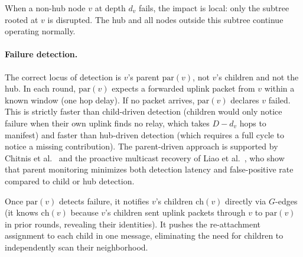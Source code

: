 \documentclass{article}
\begin{document}
When a non-hub node $v$ at depth $d_v$ fails, the impact is local: only the subtree
rooted at $v$ is disrupted. The hub and all nodes outside this subtree continue operating
normally.

\paragraph{Failure detection.} The correct locus of detection is $v$'s parent
$\mathrm{par}(v)$, not $v$'s children and not the hub. In each round, $\mathrm{par}(v)$
expects a forwarded uplink packet from $v$ within a known window (one hop delay). If no
packet arrives, $\mathrm{par}(v)$ declares $v$ failed. This is strictly faster than
child-driven detection (children would only notice failure when their own uplink finds no
relay, which takes $D - d_v$ hops to manifest) and faster than hub-driven detection
(which requires a full cycle to notice a missing contribution). The parent-driven approach
is supported by Chitnis et al.\ \citep{chitnis2009} and the proactive multicast recovery
of Liao et al.\ \citep{liao2007proactive}, who show that parent monitoring minimizes both
detection latency and false-positive rate compared to child or hub detection.

Once $\mathrm{par}(v)$ detects failure, it notifies $v$'s children
$\mathrm{ch}(v)$ directly via $G$-edges (it knows $\mathrm{ch}(v)$ because $v$'s
children sent uplink packets through $v$ to $\mathrm{par}(v)$ in prior rounds, revealing
their identities). It pushes the re-attachment assignment to each child in one message,
eliminating the need for children to independently scan their neighborhood.
\end{document}
